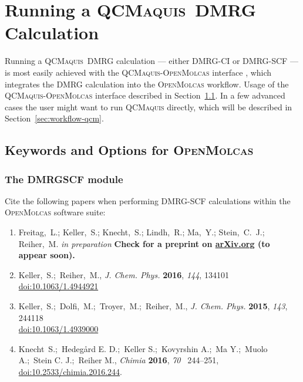 \documentclass[bibliography=totoc,12pt,a4paper]{scrartcl}
\newcommand{\mol}{\textsc{OpenMolcas}}
\newcommand{\qcm}{\textsc{QCMaquis}}
\newcommand{\hostp}{\mol}
\begin{document}
\clearpage
\newpage

\section{Running a \qcm\ DMRG Calculation}\label{sec:general-consid}

Running a \qcm\ DMRG calculation --- either DMRG-CI or DMRG-SCF --- is most easily achieved with the \qcm-\mol{} interface \cite{interface}, which integrates the DMRG calculation into the \mol{} workflow. Usage of the \qcm-\mol{} interface described in Section~\ref{sec:input}. In a few advanced cases the user might want to run \qcm{} directly, which will be described in Section~\ref{sec:workflow-qcm}.

\subsection{Keywords and Options for \hostp}\label{sec:input}

\subsubsection{The DMRGSCF module}\label{sec:dmrgscf}

\begin{framed}
\noindent Cite the following papers when performing DMRG-SCF calculations within the \mol{} software suite:
\begin{enumerate}
\item Freitag,~L.; Keller,~S.; Knecht,~S.; Lindh,~R.; Ma,~Y.; Stein,~C.~J.;
  Reiher,~M. \textit{in
		preparation} \textbf{Check for a preprint on \href{http://arxiv.org/}{arXiv.org} (to appear soon).}
\item{Keller,~S.;~Reiher,~M., \emph{J. Chem. Phys.} \textbf{2016}, \emph{144}, 134101\\ \href{https://doi.org/10.1063/1.4944921}{doi:10.1063/1.4944921}}
\item Keller,~S.;~Dolfi,~M.;~Troyer,~M.;~Reiher,~M., \emph{J. Chem. Phys.}
  \textbf{2015}, \emph{143}, 244118\\ \href{https://doi.org/10.1063/1.4939000}{doi:10.1063/1.4939000}
\item{Knecht~S.;~Hedeg{\aa}rd E. D.;~Keller S.;~Kovyrshin A.;~Ma  Y.;~Muolo A.;~Stein C. J.;~Reiher M.,
	\emph{Chimia} \textbf{2016}, \emph{70} ~244--251, \href{https://doi.org/10.2533/chimia.2016.244}{doi:10.2533/chimia.2016.244}.
}
  \end{enumerate}
\end{framed}
\end{document}
